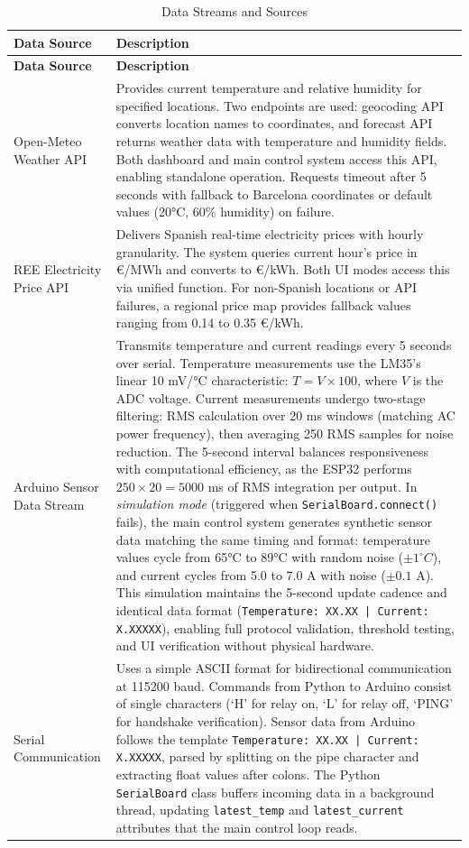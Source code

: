 \documentclass[11pt,a4paper]{article}
\begin{document}
\begin{longtable}{|L{0.3\textwidth}|p{0.65\textwidth}|}
\caption{Data Streams and Sources}
\label{tab:data_streams} \\
\hline
\textbf{Data Source} & \textbf{Description} \\
\hline
\endfirsthead
\hline
\textbf{Data Source} & \textbf{Description} \\
\hline
\endhead
\hline
\endfoot
\hline
\endlastfoot
Open-Meteo Weather API & Provides current temperature and relative humidity for specified locations. Two endpoints are used: geocoding API converts location names to coordinates, and forecast API returns weather data with temperature and humidity fields. Both dashboard and main control system access this API, enabling standalone operation. Requests timeout after 5 seconds with fallback to Barcelona coordinates or default values (20°C, 60\% humidity) on failure. \\
\hline
REE Electricity Price API & Delivers Spanish real-time electricity prices with hourly granularity. The system queries current hour's price in €/MWh and converts to €/kWh. Both UI modes access this via unified function. For non-Spanish locations or API failures, a regional price map provides fallback values ranging from 0.14 to 0.35 €/kWh. \\
\hline
Arduino Sensor Data Stream & Transmits temperature and current readings every 5 seconds over serial. Temperature measurements use the LM35's linear 10 mV/°C characteristic: $T = V \times 100$, where $V$ is the ADC voltage. Current measurements undergo two-stage filtering: RMS calculation over 20 ms windows (matching AC power frequency), then averaging 250 RMS samples for noise reduction. The 5-second interval balances responsiveness with computational efficiency, as the ESP32 performs $250 \times 20 = 5000$ ms of RMS integration per output. In \emph{simulation mode} (triggered when \texttt{SerialBoard.connect()} fails), the main control system generates synthetic sensor data matching the same timing and format: temperature values cycle from 65°C to 89°C with random noise ($\pm 1^\circ C$), and current cycles from 5.0 to 7.0 A with noise ($\pm 0.1$ A). This simulation maintains the 5-second update cadence and identical data format (\texttt{Temperature: XX.XX | Current: X.XXXXX}), enabling full protocol validation, threshold testing, and UI verification without physical hardware. \\
\hline
Serial Communication & Uses a simple ASCII format for bidirectional communication at 115200 baud. Commands from Python to Arduino consist of single characters (`H' for relay on, `L' for relay off, `PING' for handshake verification). Sensor data from Arduino follows the template \texttt{Temperature: XX.XX | Current: X.XXXXX}, parsed by splitting on the pipe character and extracting float values after colons. The Python \texttt{SerialBoard} class buffers incoming data in a background thread, updating \texttt{latest\_temp} and \texttt{latest\_current} attributes that the main control loop reads. \\
\hline
\end{longtable}
\end{document}
